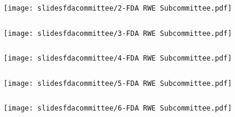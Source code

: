 \documentclass[t]{beamer}
\begin{document}
\begin{frame}
\frametitle{}
\vspace{20pt}
\begin{center}
\texttt{[image: slidesfdacommittee/2-FDA RWE Subcommittee.pdf]}
\end{center}
\vspace{35pt}
\end{frame}







\begin{frame}
\frametitle{}
\vspace{20pt}
\begin{center}
\texttt{[image: slidesfdacommittee/3-FDA RWE Subcommittee.pdf]}
\end{center}
\vspace{35pt}
\end{frame}
\begin{frame}
\frametitle{}
\vspace{20pt}
\begin{center}
\texttt{[image: slidesfdacommittee/4-FDA RWE Subcommittee.pdf]}
\end{center}
\vspace{35pt}
\end{frame}
\begin{frame}
\frametitle{}
\vspace{20pt}
\begin{center}
\texttt{[image: slidesfdacommittee/5-FDA RWE Subcommittee.pdf]}
\end{center}
\vspace{35pt}
\end{frame}
\begin{frame}
\frametitle{}
\vspace{20pt}
\begin{center}
\texttt{[image: slidesfdacommittee/6-FDA RWE Subcommittee.pdf]}
\end{center}
\vspace{35pt}
\end{frame}
\end{document}
